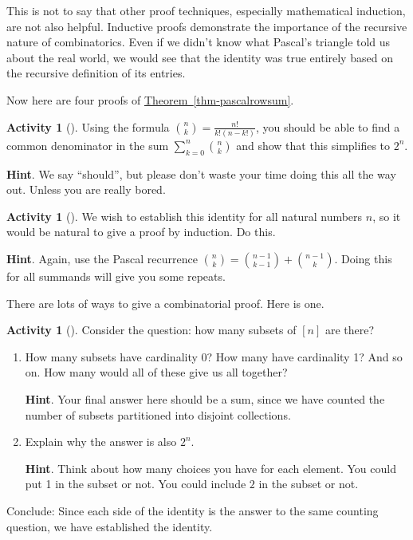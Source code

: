 \documentclass[10pt,]{book}
\theoremstyle{plain}
\theoremstyle{definition}
\theoremstyle{definition}
\theoremstyle{definition}
\newtheorem{activity}[project]{Activity}
\numberwithin{equation}{chapter}
\begin{document}
\par
\hypertarget{p-574}{}%
This is not to say that other proof techniques, especially mathematical induction, are not also helpful.  Inductive proofs demonstrate the importance of the recursive nature of combinatorics.  Even if we didn't know what Pascal's triangle told us about the real world, we would see that the identity was true entirely based on the recursive definition of its entries.%
\par
\hypertarget{p-575}{}%
Now here are four proofs of \hyperref[thm-pascalrowsum]{Theorem~\ref{thm-pascalrowsum}}.%
\begin{activity}[]\label{act-pascalrowsum-alg}
\hypertarget{p-576}{}%
Using the formula \(\binom{n}{k} = \frac{n!}{k!(n-k!)}\), you should be able to find a common denominator in the sum \(\sum_{k=0}^n \binom{n}{k}\) and show that this simplifies to \(2^n\).%
\par\smallskip%
\noindent\textbf{Hint}.\hypertarget{hint-32}{}\quad%
\hypertarget{p-577}{}%
We say ``should'', but please don't waste your time doing this all the way out.  Unless you are really bored.%
\end{activity}
\begin{activity}[]\label{activity-70}
\hypertarget{p-578}{}%
We wish to establish this identity for all natural numbers \(n\), so it would be natural to give a proof by induction.  Do this.%
\par\smallskip%
\noindent\textbf{Hint}.\hypertarget{hint-33}{}\quad%
\hypertarget{p-579}{}%
Again, use the Pascal recurrence \(\binom{n}{k} = \binom{n-1}{k-1} + \binom{n-1}{k}\).  Doing this for all summands will give you some repeats.%
\end{activity}
\hypertarget{p-580}{}%
There are lots of ways to give a combinatorial proof.  Here is one.%
\begin{activity}[]\label{activity-pascalrow-dc}
\hypertarget{p-581}{}%
Consider the question: how many subsets of \([n]\) are there?%
\begin{enumerate}[font=\bfseries,label=(\alph*),ref=\alph*]
\item\label{task-109} \hypertarget{p-582}{}%
How many subsets have cardinality 0?  How many have cardinality 1?  And so on.  How many would all of these give us all together?%
\par\smallskip%
\noindent\textbf{Hint}.\hypertarget{hint-34}{}\quad%
\hypertarget{p-583}{}%
Your final answer here should be a sum, since we have counted the number of subsets partitioned into disjoint collections.%
\item\label{task-110} \hypertarget{p-584}{}%
Explain why the answer is also \(2^n\).%
\par\smallskip%
\noindent\textbf{Hint}.\hypertarget{hint-35}{}\quad%
\hypertarget{p-585}{}%
Think about how many choices you have for each element.  You could put 1 in the subset or not.  You could include \(2\) in the subset or not.%
\end{enumerate}
\bigbreak
\hypertarget{p-586}{}%
Conclude: Since each side of the identity is the answer to the same counting question, we have established the identity.%
\end{activity}
\end{document}

